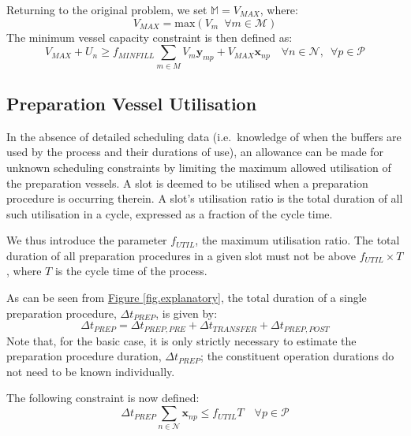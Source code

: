 Returning to the original problem, we set $\mathbb{M} = V_{\mathit{MAX}}$,
where:
\begin{equation}
    V_{\mathit{MAX}} = \text{max} \left( V_{m} \enspace \forall m \in
    \mathcal{M} \right)
\end{equation}
The minimum vessel capacity constraint is then defined as:
\begin{equation}
    V_{\mathit{MAX}} + U_{n}
    \ge f_{\mathit{MINFILL}} \sum_{m \in M} V_{m} \boldsymbol{y}_{mp}
    + V_{\mathit{MAX}} \boldsymbol{x}_{np} 
    \quad \forall n \in \mathcal{N}, \enspace \forall p \in \mathcal{P}
    \label{eq.constr3b}
\end{equation}

\subsection{Preparation Vessel Utilisation}\label{SS.constr4}

In the absence of detailed scheduling data (i.e.\ knowledge of when the buffers
are used by the process and their durations of use), an allowance can be made
for unknown scheduling constraints by limiting the maximum allowed utilisation
of the preparation vessels.
A slot is deemed to be utilised when a preparation procedure is occurring
therein.
A slot's utilisation ratio is the total duration of all such utilisation in a
cycle, expressed as a fraction of the cycle time.

We thus introduce the parameter $f_{\mathit{UTIL}}$, the maximum utilisation
ratio.
The total duration of all preparation procedures in a given slot must not be
above $f_{\mathit{UTIL}} \times T$, where $T$ is the cycle time of the
process.

As can be seen from \hyperref[fig.explanatory]{Figure \ref*{fig.explanatory}}, 
the total duration of a single preparation procedure,
$\Delta t_{\mathit{PREP}}$, is given by:
\begin{equation}
    \Delta t_{\mathit{PREP}} = \Delta t_{\mathit{PREP,PRE}} + 
    \Delta t_{\mathit{TRANSFER}} + \Delta t_{\mathit{PREP,POST}}
\end{equation}
Note that, for the basic case, it is only strictly necessary to estimate the
preparation procedure duration, $\Delta t_{\mathit{PREP}}$; the constituent
operation durations do not need to be known individually.

The following constraint is now defined:
\begin{equation}
    \Delta t_{\mathit{PREP}} \sum_{n \in \mathcal{N}} \boldsymbol{x}_{np} \le
    f_{\mathit{UTIL}} T \quad \forall p \in \mathcal{P}
    \label{eq.constr4}
\end{equation}

